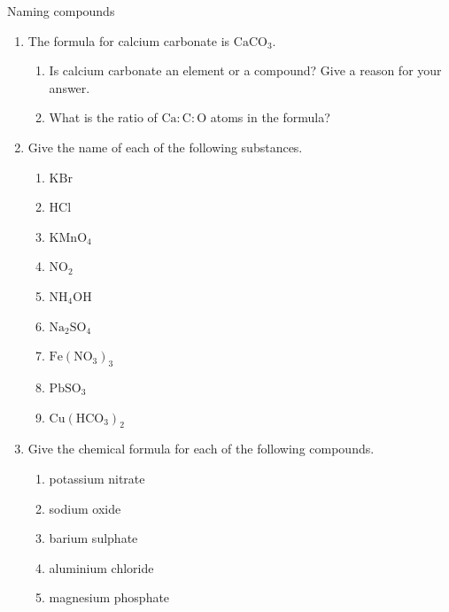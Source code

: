             \begin{exercises}{Naming compounds}
{            \nopagebreak
      \label{m38708*id65118}\begin{enumerate}[noitemsep, label=\textbf{\arabic*}. ] 
            \label{m38708*uid47}\item The formula for calcium carbonate is $\mathrm{CaCO}{}_{3}$.
\label{m38708*id65148}\begin{enumerate}[noitemsep, label=\textbf{\alph*}. ] 
            \label{m38708*uid48}\item Is calcium carbonate an element or a compound? Give a reason for your answer.
\label{m38708*uid49}\item What is the ratio of $\mathrm{Ca}:\mathrm{C}:\mathrm{O}$ atoms in the formula?
\end{enumerate}
\label{m38708*uid50}\item Give the name of each of the following substances.
\label{m38708*id65189}\begin{enumerate}[noitemsep, label=\textbf{\alph*}. ] 
            \label{m38708*uid51}\item $\mathrm{KBr}$
\label{m38708*uid52}\item $\mathrm{HCl}$
\label{m38708*uid53}\item ${\mathrm{KMnO}}_{4}$\label{m38708*uid54}\item ${\mathrm{NO}}_{2}$\label{m38708*uid55}\item ${\mathrm{NH}}_{4}\mathrm{OH}$
\label{m38708*uid56}\item ${\mathrm{Na}}_{2}{\mathrm{SO}}_{4}$
\item ${\mathrm{Fe}}({\mathrm{NO}}_{3})_3$
\item ${\mathrm{Pb}}{\mathrm{SO}}_{3}$
\item ${\mathrm{Cu}}({\mathrm{HCO}}_{3})_2$
\end{enumerate}
\label{m38708*uid57}\item Give the chemical formula for each of the following compounds.
\label{m38708*id65338}\begin{enumerate}[noitemsep, label=\textbf{\alph*}. ] 
            \label{m38708*uid58}\item potassium nitrate
\label{m38708*uid59}\item sodium oxide
\label{m38708*uid60}\item barium sulphate
\label{m38708*uid61}\item aluminium chloride
\label{m38708*uid62}\item magnesium phosphate

\end{enumerate}
\end{enumerate}}
\end{exercises}
